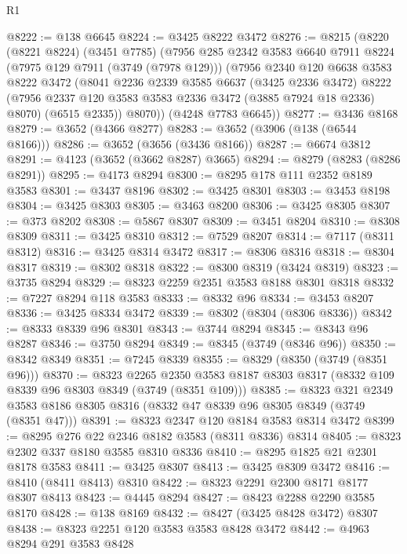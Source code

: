 \begin{lexlean}{R1}
\begin{coremodule}
@8222 := @138 @6645
@8224 := @3425 @8222 @3472
@8276 := @8215
    (@8220
      (@8221 @8224)
      (@3451 @7785)
      (@7956
        @285
        @2342
        @3583
        @6640
        @7911
        @8224
        (@7975 @129 @7911 (@3749 (@7978 @129)))
        (@7956
          @2340
          @120
          @6638
          @3583
          @8222
          @3472
          (@8041
            @2236
            @2339
            @3585
            @6637
            (@3425 @2336 @3472)
            @8222
            (@7956 @2337 @120 @3583 @3583 @2336 @3472 (@3885 @7924 @18 @2336) @8070)
            (@6515 @2335))
          @8070))
      (@4248 @7783 @6645))
@8277 := @3436 @8168
@8279 := @3652 (@4366 @8277)
@8283 := @3652 (@3906 (@138 (@6544 @8166)))
@8286 := @3652 (@3656 (@3436 @8166))
@8287 := @6674 @3812
@8291 := @4123 (@3652 (@3662 @8287) @3665)
@8294 := @8279 (@8283 (@8286 @8291))
@8295 := @4173 @8294
@8300 := @8295 @178 @111 @2352 @8189 @3583
@8301 := @3437 @8196
@8302 := @3425 @8301
@8303 := @3453 @8198
@8304 := @3425 @8303
@8305 := @3463 @8200
@8306 := @3425 @8305
@8307 := @373 @8202
@8308 := @5867 @8307
@8309 := @3451 @8204
@8310 := @8308 @8309
@8311 := @3425 @8310
@8312 := @7529 @8207
@8314 := @7117 (@8311 @8312)
@8316 := @3425 @8314 @3472
@8317 := @8306 @8316
@8318 := @8304 @8317
@8319 := @8302 @8318
@8322 := @8300 @8319 (@3424 @8319)
@8323 := @3735 @8294
@8329 := @8323 @2259 @2351 @3583 @8188 @8301 @8318
@8332 := @7227 @8294 @118 @3583
@8333 := @8332 @96
@8334 := @3453 @8207
@8336 := @3425 @8334 @3472
@8339 := @8302 (@8304 (@8306 @8336))
@8342 := @8333 @8339 @96 @8301
@8343 := @3744 @8294
@8345 := @8343 @96 @8287
@8346 := @3750 @8294
@8349 := @8345 (@3749 (@8346 @96))
@8350 := @8342 @8349
@8351 := @7245 @8339
@8355 := @8329 (@8350 (@3749 (@8351 @96)))
@8370 := @8323
    @2265
    @2350
    @3583
    @8187
    @8303
    @8317
    (@8332 @109 @8339 @96 @8303 @8349 (@3749 (@8351 @109)))
@8385 := @8323
    @321
    @2349
    @3583
    @8186
    @8305
    @8316
    (@8332 @47 @8339 @96 @8305 @8349 (@3749 (@8351 @47)))
@8391 := @8323 @2347 @120 @8184 @3583 @8314 @3472
@8399 := @8295 @276 @22 @2346 @8182 @3583 (@8311 @8336) @8314
@8405 := @8323 @2302 @337 @8180 @3585 @8310 @8336
@8410 := @8295 @1825 @21 @2301 @8178 @3583
@8411 := @3425 @8307
@8413 := @3425 @8309 @3472
@8416 := @8410 (@8411 @8413) @8310
@8422 := @8323 @2291 @2300 @8171 @8177 @8307 @8413
@8423 := @4445 @8294
@8427 := @8423 @2288 @2290 @3585 @8170
@8428 := @138 @8169
@8432 := @8427 (@3425 @8428 @3472) @8307
@8438 := @8323 @2251 @120 @3583 @3583 @8428 @3472
@8442 := @4963 @8294 @291 @3583 @8428

\end{coremodule}
\end{lexlean}

